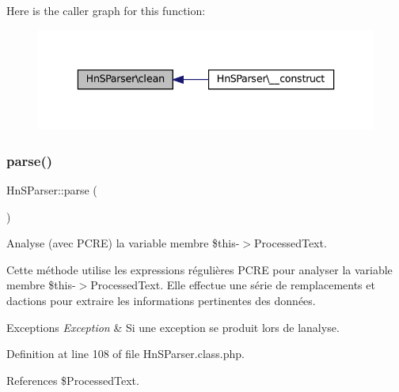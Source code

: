 Here is the caller graph for this function\+:\nopagebreak
\begin{figure}[H]
\begin{center}
\leavevmode
\includegraphics[width=336pt]{class_hn_s_parser_a09477de7b8332274e60f5d62d1053f3f_icgraph}
\end{center}
\end{figure}
\mbox{\label{class_hn_s_parser_a472740b8d6c5cc96019b67fe6304d828}} 
\subsubsection{\texorpdfstring{parse()}{parse()}}
{\footnotesize\ttfamily Hn\+S\+Parser\+::parse (\begin{DoxyParamCaption}{ }\end{DoxyParamCaption})}

Analyse (avec P\+C\+RE) la variable membre \$this-\/$>$Processed\+Text.

Cette méthode utilise les expressions régulières P\+C\+RE pour analyser la variable membre \$this-\/$>$Processed\+Text. Elle effectue une série de remplacements et d\textquotesingle{}actions pour extraire les informations pertinentes des données.


\begin{DoxyExceptions}{Exceptions}
{\em Exception} & Si une exception se produit lors de l\textquotesingle{}analyse. \\
\hline
\end{DoxyExceptions}


Definition at line 108 of file Hn\+S\+Parser.\+class.\+php.



References \$\+Processed\+Text.

\mbox{\label{class_hn_s_parser_ac5bb3acdf1dffb3e1ecd67de9e0e5b06}} 
